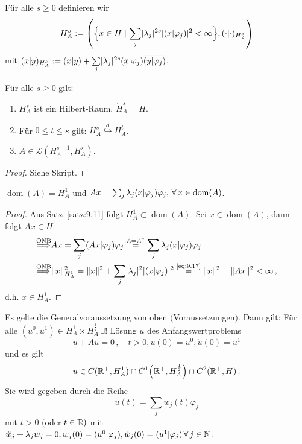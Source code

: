 \begin{defi}
Für alle $s \geq 0$ definieren wir
\[
	H_A^s := \left( \Big\{x \in H \;\vert\, \sum_j  \lvert \lambda_j\rvert^{2s} \lvert (x|\varphi_j)\rvert^2 < \infty \Big\}, (\cdot | \cdot )_{H_A^s} \right)
\]
mit $(x|y)_{H_A^s} := (x|y) + \sum\limits_j \lvert \lambda_j\rvert^{2s} (x|\varphi_j) \overline{(y |\varphi_j)}$.
\end{defi}

\begin{satz}
\label{satz:9.11}
Für alle $s \geq 0$ gilt:
\begin{enumerate}[\rm(i)]
\item $H_A^s$ ist ein Hilbert-Raum, $\mathring H_A^s = H$.
\item Für $0 \leq t\leq s$ gilt: $H_A^s \stackrel{d}\hookrightarrow H_A^t$.
\item $A\in \mathcal L(H_A^{s+1},H_A^s)$. 
\end{enumerate}
\end{satz}

\begin{proof}
Siehe Skript.
\end{proof}

\begin{kor}
\label{kor:9.12}
$\operatorname{dom}(A) = H_A^1$ und $Ax = \sum_j \lambda_j (x|\varphi_j) \varphi_j, \, \forall\, x \in \operatorname{dom}(A)$.
\end{kor}

\begin{proof}
Aus Satz~\ref{satz:9.11} folgt $H_A^1 \subset \operatorname{dom}(A)$. Sei $x \in \operatorname{dom}(A)$, dann folgt $Ax \in H$.
\begin{align}
\label{eq:9.17}
\stackrel{\scriptsize\text{ONB}}{\Longrightarrow} & Ax = \sum_j (Ax | \varphi_j) \varphi_j \stackrel{A=A^\ast}= \sum_j \lambda_j (x | \varphi_j) \varphi_j \\
\stackrel{\scriptsize\text{ONB}}{\Longrightarrow} & \lVert x\rVert^2_{H^1_A} = \lVert x\rVert^2 + \sum_j \lvert \lambda_j\rvert^2 \lvert (x|\varphi_j)\rvert^2 \stackrel{\scriptsize\eqref{eq:9.17}}= \lVert x\rVert^2 + \lVert Ax\rVert^2 < \infty \, ,
\notag
\end{align}
d.h. $x \in H^1_A$.
\end{proof}

\begin{theorem}
\label{theorem:9.13}
Es gelte die Generalvoraussetzung von oben $($Voraussetzungen$)$. Dann gilt: Für alle $(u^0,u^1) \in H_A^1 \times H^{\frac 1 2}_A \, \exists ! $ Lösung $u$ des Anfangswertproblems 
\[
	\ddot u + Au = 0 \, , \quad t > 0 , u(0) = u^0, \dot u (0 )= u^1
\]
und es gilt
\[
	u \in C(\mathbb{R}^+,H^1_A) \cap C^1\Big(\mathbb{R}^+,H^{\frac 1 2}_A\Big) \cap C^2 (\mathbb{R}^+, H) \, .
\]
Sie wird gegeben durch die Reihe
\[
	u(t) = \sum_j w_j(t) \varphi_j
\]
mit $t > 0$ $($oder $t\in \mathbb{R})$ mit $\ddot w_j + \lambda_j w_j = 0, w_j(0) = (u^0|\varphi_j),\dot w_j(0) = (u^1|\varphi_j) \, \forall \, j \in \mathbb{N}$.
\end{theorem}

